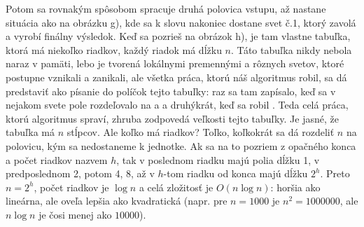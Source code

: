 Potom sa rovnakým spôsobom spracuje druhá polovica vstupu, až nastane situácia
ako na obrázku g), kde sa k slovu nakoniec dostane svet č.1, ktorý zavolá 
a vyrobí finálny výsledok. Keď sa pozrieš na obrázok h), je tam vlastne tabuľka,
ktorá má niekoľko riadkov, každý riadok má dĺžku $n$. Táto tabuľka nikdy nebola 
naraz v pamäti, lebo je tvorená lokálnymi premennými  a 
rôznych svetov, ktoré postupne vznikali a zanikali, 
ale všetka práca, ktorú náš algoritmus robil, sa dá predstaviť 
ako písanie do políčok tejto tabuľky: raz sa tam zapísalo, keď sa v nejakom svete
pole  rozdeľovalo na  a  a druhýkrát, keď sa robil .
Teda celá práca, ktorú algoritmus spraví, zhruba zodpovedá veľkosti tejto
tabuľky. Je jasné, že tabuľka má $n$ stĺpcov. Ale koľko má riadkov? Toľko, koľkokrát
sa dá rozdeliť $n$ na polovicu, kým sa nedostaneme k jednotke. Ak sa na to pozriem
z opačného konca a počet riadkov nazvem $h$, tak v poslednom riadku majú polia
dĺžku 1, v predposlednom 2, potom 4, 8, až v $h$-tom riadku od konca majú dĺžku $2^h$.
Preto $n=2^h$,
počet riadkov je $\log n$ a celá zložitosť je $O(n\log n)$: horšia ako lineárna,
ale oveľa lepšia ako kvadratická (napr. pre $n=1000$ je $n^2=1000000$, ale $n\log n$
je čosi menej ako $10000$).
